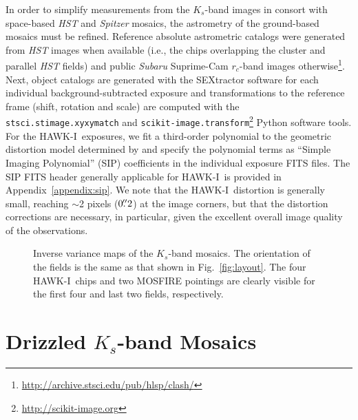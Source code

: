 \documentclass[preprint2]{aastex6}
\gdef\HAWKI{\mbox{HAWK-I}}
\begin{document}
In order to simplify measurements from the $K_s$-band images in consort with space-based \textit{HST} and \textit{Spitzer} mosaics, the astrometry of the ground-based mosaics must be refined.  Reference absolute astrometric catalogs were generated from \textit{HST} images when available (i.e., the chips overlapping the cluster and parallel \textit{HST} fields) and public \textit{Subaru} Suprime-Cam $r_c$-band images otherwise\footnote{\url{http://archive.stsci.edu/pub/hlsp/clash/}}.  Next, object catalogs are generated with the SEXtractor software \citep{bertin:96} for each individual background-subtracted exposure and transformations to the reference frame (shift, rotation and scale) are computed with the \texttt{stsci.stimage.xyxymatch} and \texttt{scikit-image.transform}\footnote{\url{http://scikit-image.org}} Python software tools.  For the \HAWKI\ exposures, we fit a third-order polynomial to the geometric distortion model determined by \cite{libralato:14} and specify the polynomial terms as ``Simple Imaging Polynomial'' (SIP) coefficients \citep{fits:sip} in the individual exposure FITS files.  The SIP FITS header generally applicable for \HAWKI\ is provided in Appendix~\ref{appendix:sip}.  We note that the \HAWKI\ distortion is generally small, reaching $\sim$2 pixels ($0\mbox{$.\!\!^{\prime\prime}$}2$) at the image corners, but that the distortion corrections are necessary, in particular, given the excellent overall image quality of the observations. 


\begin{figure}[!t]
\caption{Inverse variance maps of the $K_s$-band mosaics.  The orientation of the fields is the same as that shown in Fig.~\ref{fig:layout}.  The four \HAWKI\ chips and two MOSFIRE pointings are clearly visible for the first four and last two fields, respectively.
\label{fig:ivar_mosaics}}  
\end{figure}

\section{Drizzled $K_s$-band Mosaics}
\label{s:mosaic}
\end{document}
